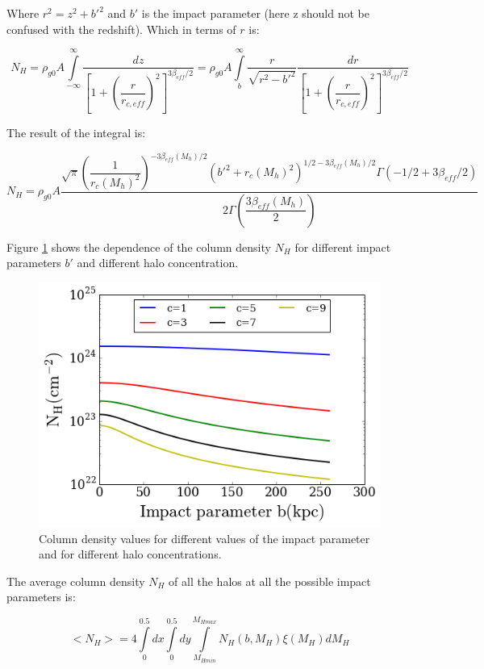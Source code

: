 \documentclass[12pt]{article}
\begin{document}
Where $r^2 = z^2 + b'^2$ and $b'$ is the impact parameter (here z
should not be confused with the redshift).
Which in terms of $r$ is:

\begin{equation}
N_{H} = \rho_{g0}A \int \limits_{-\infty}^{\infty} \dfrac{dz}{\left
[ 1 + \left(\dfrac{r}{r_{c,eff}} \right)^2 \right]^{3\beta_{eff}/2}}
= \rho_{g0}A \int \limits_{b}^{\infty}\dfrac{r}{\sqrt{r^2 - b'^2}}\dfrac{dr}
{\left [ 1 + \left(\dfrac{r}{r_{c,eff}} \right)^2 \right]^{3\beta_{eff}/2}}
\end{equation}

The result of the integral is:

\begin{equation}\label{eq:NH}
N_{H} = \rho_{g0} A\dfrac{\sqrt{\pi} (\dfrac{1}{r_c(M_h)^2})^{-3\beta_{eff}(M_h) /2} (b'^2 + r_c(M_h)^2)^{1/2 - 3\beta_{eff}(M_h)/2} \Gamma(-1/2 + 3\beta_{eff}/2) }{2 \Gamma(\dfrac{3\beta_{eff}(M_h)}{2})}
\end{equation}


Figure \ref{fig:NHb} shows the dependence of the column density $N_H$
for different impact parameters $b'$ and different halo concentration.
\begin{figure}[H]
\centering
\includegraphics[scale=0.7]{../code/env/NH-b.png}
\caption{Column density values for different values of the impact
parameter and for different halo concentrations.\label{fig:NHb}}
\end{figure}

The average column density $N_H$ of all the halos at all the possible
impact parameters is:

\begin{equation}\label{eq:integral}
<N_H> = 4 \int \limits_0^{0.5} dx \int \limits_{0}^{0.5}dy \int
\limits_{M_{Hmin}}^{M_{Hmax}} N_H(b, M_H)\xi(M_H)dM_H
\end{equation}
\end{document}
